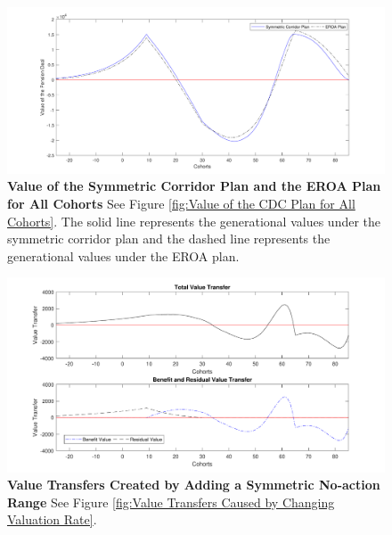 \documentclass{sfuthesis}
\numberwithin{equation}{chapter}
\begin{document}
		\begin{figure}[H]
			\includegraphics[width=1\linewidth]{ResultPlot/VPension2.pdf} 
			\caption[Value of the Symmetric Corridor Plan and the EROA Plan for All Cohorts]{\textbf{Value of the Symmetric Corridor Plan and the EROA Plan for All Cohorts}
			\newline\footnotesize\justify See Figure \ref{fig:Value of the CDC Plan for All Cohorts}. The solid line represents the generational values under the symmetric corridor plan and the dashed line represents the generational values under the EROA plan.}
			\label{fig:Value of the Symmetric Corridor Plan for All Cohorts}	
		\end{figure}
    	\begin{figure}[H]
			\includegraphics[width=1\linewidth]{ResultPlot/Vtrans2.pdf} 
			\caption[Value Transfers Created by Adding a Symmetric No-action Range]{\textbf{Value Transfers Created by Adding a Symmetric No-action Range}
			\vspace{-0.4cm}
			\newline\footnotesize\justify See Figure \ref{fig:Value Transfers Caused by Changing Valuation Rate}.}
			\label{fig:Value Transfers Created by Adding a Symmetric No-action Range}
		\end{figure}
		
\end{document}
